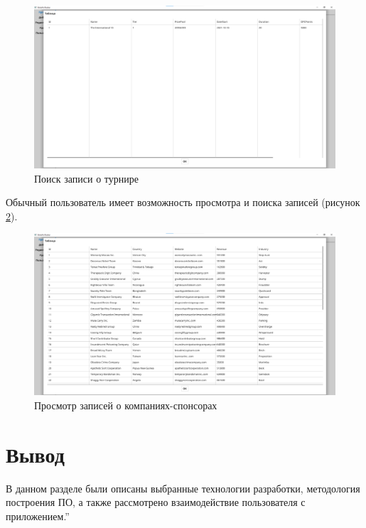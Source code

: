 \clearpage

\begin{figure}[h!btp]
	\centering
	\includegraphics[scale = 0.3]{inc/img/find.png}
	\caption{Поиск записи о турнире}
	\label{fig:find}	
\end{figure}

Обычный пользователь имеет возможность просмотра и поиска записей (рисунок \ref{fig:companies}).

\begin{figure}[h!btp]
	\centering
	\includegraphics[scale = 0.3]{inc/img/companies.png}
	\caption{Просмотр записей о компаниях-спонсорах}
	\label{fig:companies}	
\end{figure}


\section*{Вывод}

В данном разделе были описаны выбранные технологии разработки, методология построения ПО, а также рассмотрено взаимодействие пользователя с приложением.''
